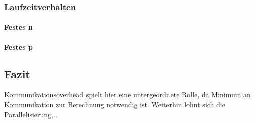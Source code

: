 \subsubsection{Laufzeitverhalten}
\paragraph{Festes n}
\paragraph{Festes p}

\subsection{Fazit}
\label{ref:fazit}
Kommunikationsoverhead spielt hier eine untergeordnete Rolle, da Minimum an Kommunikation zur Berechnung notwendig ist.
Weiterhin lohnt sich die Parallelisierung,..


%
%


